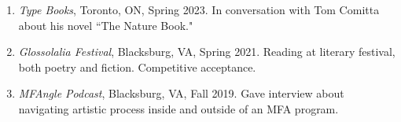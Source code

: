 \begin{enumerate}
    
    \item \emph{Type Books}, Toronto, ON, Spring 2023. \subitem In conversation with Tom Comitta about his novel ``The Nature Book." \\
    
    
      \item  \emph{Glossolalia Festival}, Blacksburg, VA, Spring 2021. \subitem Reading at literary festival, both poetry and fiction. Competitive acceptance. \\
  \item  \emph{MFAngle Podcast}, Blacksburg, VA, Fall 2019. \subitem Gave interview about navigating artistic process inside and outside of an MFA program.
 
 \end{enumerate}
